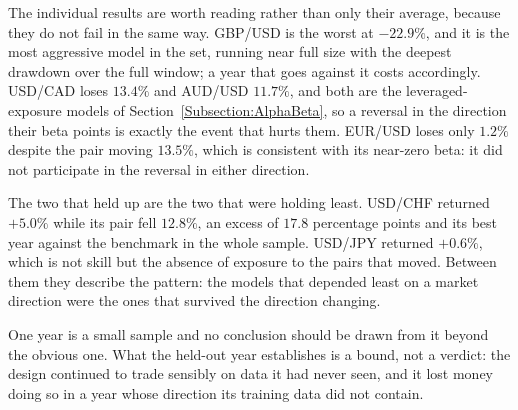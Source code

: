 The individual results are worth reading rather than only their average, because they do not fail in the same way. GBP/USD is the worst at $-22.9\%$, and it is the most aggressive model in the set, running near full size with the deepest drawdown over the full window; a year that goes against it costs accordingly. USD/CAD loses $13.4\%$ and AUD/USD $11.7\%$, and both are the leveraged-exposure models of Section~\ref{Subsection:AlphaBeta}, so a reversal in the direction their beta points is exactly the event that hurts them. EUR/USD loses only $1.2\%$ despite the pair moving $13.5\%$, which is consistent with its near-zero beta: it did not participate in the reversal in either direction.

The two that held up are the two that were holding least. USD/CHF returned $+5.0\%$ while its pair fell $12.8\%$, an excess of $17.8$ percentage points and its best year against the benchmark in the whole sample. USD/JPY returned $+0.6\%$, which is not skill but the absence of exposure to the pairs that moved. Between them they describe the pattern: the models that depended least on a market direction were the ones that survived the direction changing.

One year is a small sample and no conclusion should be drawn from it beyond the obvious one. What the held-out year establishes is a bound, not a verdict: the design continued to trade sensibly on data it had never seen, and it lost money doing so in a year whose direction its training data did not contain.